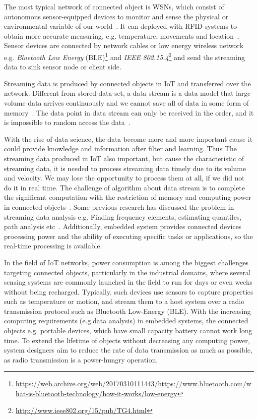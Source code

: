 The most typical network of connected object is WSNs, which consist of
autonomous sensor-equipped devices to monitor and sense the physical or
environmental variable of our world~\cite{lee2015internet, li2016temporal}. It
can deployed with RFID systems to obtain more accurate measuring, e.g.
temperature, movements and location~\cite{lee2015internet, atzori2010b}. Sensor
devices are connected by network cables or low energy wireless network e.g.
\emph{Bluetooth Low Energy}
(BLE)\footnote{\url{https://web.archive.org/web/20170310111443/https://www.bluetooth.com/what-is-bluetooth-technology/how-it-works/low-energy}}
and \emph{IEEE 802.15.4}\footnote{\url{http://www.ieee802.org/15/pub/TG4.html}}
and send the streaming data to sink sensor node or client side.

Streaming data is produced by connected objects in IoT and transferred over the
network. Different from stored data-set, a data stream is a data model that
large volume data arrives continuously and we cannot save all of data in some
form of memory~\cite{o2002streaming}. The data point in data stream can only be
received in the order, and it is impossible to random access the
data~\cite{o2002streaming}.

With the rise of data science, the data become more and more important cause it
could provide knowledge and information after filter and learning. Thus The
streaming data produced in IoT also important, but cause the characteristic of
streaming data, it is needed to process streaming data timely due to its volume
and velocity. We may lose the opportunity to process them at all, if we did not
do it in real time. The challenge of algorithm about data stream is to complete
the significant computation with the restriction of memory and computing power
in connected objects~\cite{o2002streaming}. Some previous research has discussed
the problem in streaming data analysis e.g. Finding frequency elements,
estimating quantiles, path analysis etc~\cite{kejariwal2015real}. 
Additionally, embedded system provides connected devices processing power and
the ability of executing specific tasks or applications, so the real-time
processing is available. 


In the field of IoT networks, power consumption is among the biggest challenges
targeting connected objects, particularly in the industrial domains, where
several sensing systems are commonly launched in the field to run for days or
even weeks without being recharged. Typically, such devices use sensors to
capture properties such as temperature or motion, and stream them to a host
system over a radio transmission protocol such as Bluetooth Low-Energy (BLE).
With the increasing computing requirements (e.g.data analysis) in embedded
systems, the connected objects e.g. portable devices, which have small capacity
battery cannot work long time. To extend the lifetime of objects without
decreasing any computing power, system designers aim to reduce the rate of data
transmission as much as possible, as radio transmission is a power-hungry
operation.


